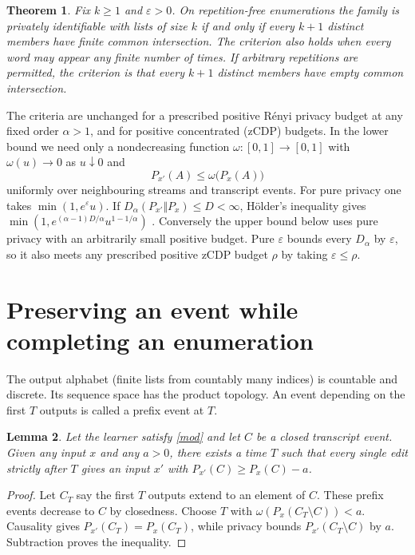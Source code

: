 \documentclass[11pt]{article}
\newtheorem{theorem}{Theorem}
\newtheorem{lemma}[theorem]{Lemma}
\begin{document}
\begin{theorem}\label{main}
Fix $k\ge1$ and $\varepsilon>0$. On repetition-free enumerations the family is privately identifiable with lists of size $k$ if and only if every $k+1$ distinct members have finite common intersection. The criterion also holds when every word may appear any finite number of times. If arbitrary repetitions are permitted, the criterion is that every $k+1$ distinct members have empty common intersection.
\end{theorem}

The criteria are unchanged for a prescribed positive R\'enyi privacy budget at any fixed order $\alpha>1$, and for positive concentrated (zCDP) budgets. In the lower bound we need only a nondecreasing function $\omega:[0,1]\to[0,1]$ with $\omega(u)\to0$ as $u\downarrow0$ and
\begin{equation}\label{mod}
 P_{x'}(A)\le \omega\big(P_x(A)\big)
\end{equation}
uniformly over neighbouring streams and transcript events. For pure privacy one takes $\min(1,e^\varepsilon u)$. If $D_\alpha(P_{x'}\Vert P_x)\le D<\infty$, H\"older's inequality gives $\min(1,e^{(\alpha-1)D/\alpha}u^{1-1/\alpha})$ \cite{mir}. Conversely the upper bound below uses pure privacy with an arbitrarily small positive budget. Pure $\varepsilon$ bounds every $D_\alpha$ by $\varepsilon$, so it also meets any prescribed positive zCDP budget $\rho$ by taking $\varepsilon\le\rho$.

\section{Preserving an event while completing an enumeration}
The output alphabet (finite lists from countably many indices) is countable and discrete. Its sequence space has the product topology. An event depending on the first $T$ outputs is called a prefix event at $T$.

\begin{lemma}\label{closed}
Let the learner satisfy \eqref{mod} and let $C$ be a closed transcript event. Given any input $x$ and any $a>0$, there exists a time $T$ such that every single edit strictly after $T$ gives an input $x'$ with $P_{x'}(C)\ge P_x(C)-a$.
\end{lemma}
\begin{proof}
Let $C_T$ say the first $T$ outputs extend to an element of $C$. These prefix events decrease to $C$ by closedness. Choose $T$ with $\omega(P_x(C_T\setminus C))<a$. Causality gives $P_{x'}(C_T)=P_x(C_T)$, while privacy bounds $P_{x'}(C_T\setminus C)$ by $a$. Subtraction proves the inequality.
\end{proof}
\end{document}
